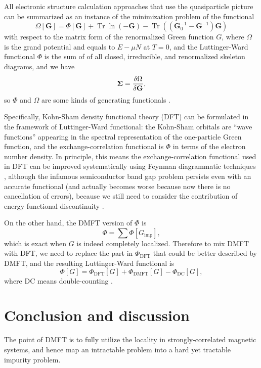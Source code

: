 \documentclass[hyperref, a4paper]{article}
\begin{document}
All electronic structure calculation approaches that use the quasiparticle picture 
can be summarized as an instance of the minimization problem 
of the functional 
\begin{equation}
    \Omega[\mathbf{G}]= \Phi[\mathbf{G}]+\operatorname{Tr} \ln (-\mathbf{G})-\operatorname{Tr}\left(\left(\mathbf{G}_0^{-1}-\mathbf{G}^{-1}\right) \mathbf{G}\right)
\end{equation}
with respect to the matrix form of the renormalized Green function $G$,
where $\Omega$ is the grand potential
and equals to $E - \mu N$ at $T = 0$, 
and the Luttinger-Ward functional $\Phi$ 
is the sum of of all closed, irreducible, and renormalized skeleton diagrams,
and we have 
\begin{equation}
    \mathbf{\Sigma} = \fdv{\Omega}{\mathbf{G}}, 
\end{equation}
so $\Phi$ and $\Omega$ are some kinds of generating functionals
\cite{PhysRev.118.1417,potthoff2003self}.

Specifically, Kohn-Sham density functional theory (DFT) 
can be formulated in the framework of Luttinger-Ward functional: 
the Kohn-Sham orbitals are ``wave functions'' 
appearing in the spectral representation of the one-particle Green function,
and the exchange-correlation functional 
is $\Phi$ in terms of the electron number density.
In principle, 
this means the exchange-correlation functional used in DFT
can be improved systematically using Feynman diagrammatic techniques
\cite{aryasetiawan2002total,gruning2006density},
although the infamous semiconductor band gap problem
persists even with an accurate functional
(and actually becomes worse because now there is no cancellation of errors),
because we still need to consider the contribution of 
energy functional discontinuity
\cite{gruning2006density}.

On the other hand, the DMFT version of $\Phi$ is 
\begin{equation}
    \Phi = \sum \Phi[G_{\text{imp}}],
\end{equation}
which is exact when $G$ is indeed completely localized.
Therefore to mix DMFT with DFT, 
we need to replace the part in $\Phi_{\text{DFT}}$ that could be better described by DMFT,
and the resulting Luttinger-Ward functional is 
\begin{equation}
    \Phi[G] = \Phi_{\text{DFT}}[G] + \Phi_{\text{DMFT}}[G] - \Phi_{\text{DC}}[G],
\end{equation}
where DC means double-counting \cite{haule2015free}.

\section{Conclusion and discussion}

The point of DMFT is to fully utilize the locality in strongly-correlated magnetic systems,
and hence map an intractable problem into 
a hard yet tractable impurity problem.


\printbibliography
\end{document}

